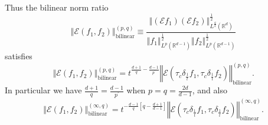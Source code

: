 \documentclass{amsart}%
\theoremstyle{plain}
\numberwithin{equation}{section}
\begin{document}
Thus the bilinear norm ratio%
\begin{equation}
\left\Vert \mathcal{E}\left(  f_{1},f_{2}\right)  \right\Vert
_{\operatorname*{bilinear}}^{\left(  p,q\right)  }\equiv\frac{\left\Vert
\left(  \mathcal{E}f_{1}\right)  \left(  \mathcal{E}f_{2}\right)  \right\Vert
_{L^{\frac{q}{2}}\left(  \mathbb{R}^{d}\right)  }^{\frac{1}{2}}}{\left\Vert
f_{1}\right\Vert _{L^{p}\left(  \mathbb{R}^{d-1}\right)  }^{\frac{1}{2}%
}\left\Vert f_{2}\right\Vert _{L^{p}\left(  \mathbb{R}^{d-1}\right)  }%
^{\frac{1}{2}}}\label{def bil norm rat}%
\end{equation}
satisfies%
\begin{equation}
\left\Vert \mathcal{E}\left(  f_{1},f_{2}\right)  \right\Vert
_{\operatorname*{bilinear}}^{\left(  p,q\right)  }=t^{\frac{d+1}{q}-\frac
{d-1}{p^{\prime}}}\left\Vert \mathcal{E}\left(  \tau_{c}\delta_{\frac{1}{t}%
}f_{1},\tau_{c}\delta_{\frac{1}{t}}f_{2}\right)  \right\Vert
_{\operatorname*{bilinear}}^{\left(  p,q\right)  }.\label{dil'}%
\end{equation}
In particular we have $\frac{d+1}{q}=\frac{d-1}{p^{\prime}}$ when
$p=q=\frac{2d}{d-1}$, and also%
\begin{equation}
\left\Vert \mathcal{E}\left(  f_{1},f_{2}\right)  \right\Vert
_{\operatorname*{bilinear}}^{\left(  \infty,q\right)  }=t^{-\frac{d-1}%
{q}\left[  q-\frac{d+1}{d-1}\right]  }\left\Vert \mathcal{E}\left(  \tau
_{c}\delta_{\frac{1}{t}}f_{1},\tau_{c}\delta_{\frac{1}{t}}f_{2}\right)
\right\Vert _{\operatorname*{bilinear}}^{\left(  \infty,q\right)
}.\label{dil''}%
\end{equation}
\end{document}
